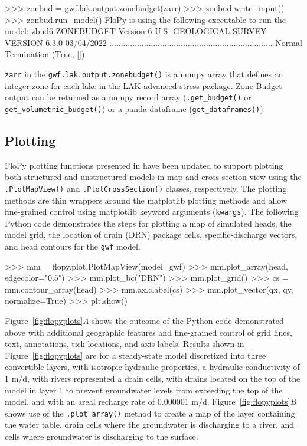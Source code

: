 \documentclass[11pt, oneside]{article}  	%
\begin{document}
\begin{python}
>>> zonbud = gwf.lak.output.zonebudget(zarr)
>>> zonbud.write_input()
>>> zonbud.run_model()
FloPy is using the following executable to run the model: zbud6
                    ZONEBUDGET Version 6
                   U.S. GEOLOGICAL SURVEY
                  VERSION 6.3.0 03/04/2022
.......................................................................
Normal Termination
(True, [])
\end{python}

\noindent \texttt{zarr} in the \texttt{gwf.lak.output.zonebudget()} is a numpy array that defines an integer zone for each lake in the LAK advanced stress package. Zone Budget output can be returned as a numpy record array (\texttt{.get\_budget()} or \texttt{get\_volumetric\_budget()}) or a panda dataframe (\texttt{get\_dataframes()}).

\subsection{Plotting} \label{sec:plotting}

FloPy plotting functions presented in \cite{bakker2016scripting} have been updated to support plotting both structured and unstructured models in map and cross-section view using the \texttt{.PlotMapView()} and \texttt{.PlotCrossSection()} classes, respectively. The plotting methods are thin wrappers around the matplotlib plotting methods \citep{hunter2007matplotlib} and allow fine-grained control using matplotlib keyword arguments (\texttt{kwargs}). The following Python code demonstrates the steps for plotting a map of simulated heads, the model grid, the location of drain (DRN) package cells, specific-discharge vectors, and head contours for the \texttt{gwf} model.

\begin{python}
>>> mm = flopy.plot.PlotMapView(model=gwf)
>>> mm.plot_array(head, edgecolor="0.5")
>>> mm.plot_bc("DRN")
>>> mm.plot_grid()
>>> cs = mm.contour_array(head)
>>> mm.ax.clabel(cs)
>>> mm.plot_vector(qx, qy, normalize=True)
>>> plt.show()
\end{python}

\noindent Figure~\ref{fig:flopyplots}\textit{A} shows the outcome of the Python code demonstrated above with additional geographic features and fine-grained control of grid lines, text, annotations, tick locations, and axis labels. Results shown in Figure~\ref{fig:flopyplots} are for a steady-state model discretized into three convertible layers, with isotropic hydraulic properties, a hydraulic conductivity of 1 m/d, with rivers represented a drain cells, with drains located on the top of the model in layer 1 to prevent groundwater levels from exceeding the top of the model, and with an areal recharge rate of 0.000001 m/d. Figure~\ref{fig:flopyplots}\textit{B} shows use of the \texttt{.plot\_array()} method to create a map of the layer containing the water table, drain cells where the groundwater is discharging to a river, and cells where groundwater is discharging to the surface.
\end{document}
